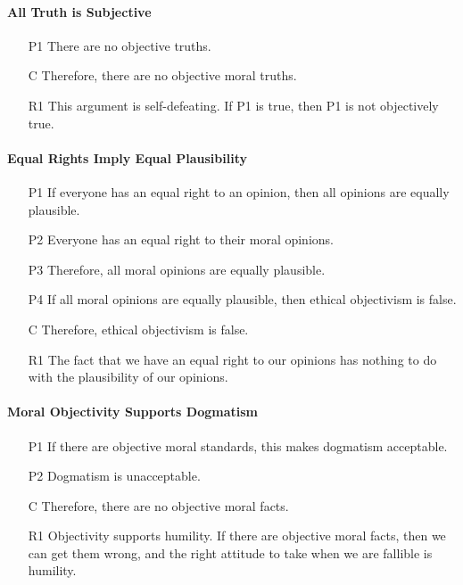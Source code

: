 \documentclass[12pt]{article}
\begin{document}
\paragraph{All Truth is Subjective}
\begin{itemize}
    \item [P1] There are no objective truths.
    \item [C] Therefore, there are no objective moral truths.
    \item [R1] This argument is self-defeating. If P1 is true, then P1 is not objectively true.
\end{itemize}

\paragraph{Equal Rights Imply Equal Plausibility}
\begin{itemize}
    \item [P1] If everyone has an equal right to an opinion, then all opinions are equally plausible.
    \item [P2] Everyone has an equal right to their moral opinions.
    \item [P3] Therefore, all moral opinions are equally plausible.
    \item [P4] If all moral opinions are equally plausible, then ethical objectivism is false.
    \item [C] Therefore, ethical objectivism is false.
    \item [R1] The fact that we have an equal right to our opinions has nothing to do with the plausibility of our opinions. 
\end{itemize}

\paragraph{Moral Objectivity Supports Dogmatism}
\begin{itemize}
    \item [P1] If there are objective moral standards, this makes dogmatism acceptable.
    \item [P2] Dogmatism is unacceptable.
    \item [C] Therefore, there are no objective moral facts.
    \item [R1] Objectivity supports humility. If there are objective moral facts, then we can get them wrong, and the right attitude to take when we are fallible is humility.
\end{itemize}
\end{document}
